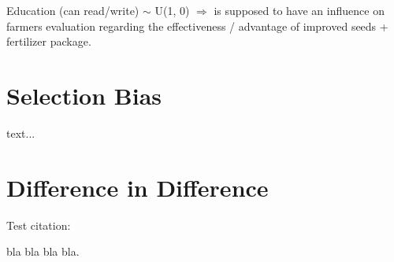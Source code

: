  
Education (can read/write) $\sim$ U(1, 0) $\Rightarrow$ is supposed to have an influence on farmers evaluation regarding the effectiveness / advantage of improved seeds + fertilizer package.


\section{Selection Bias} \label{sec:selection}

text...


\section{Difference in Difference} \label{sec:difference}

Test citation:

bla bla \cite{Foroni2011} bla bla. \\


\clearpage





\clearpage


